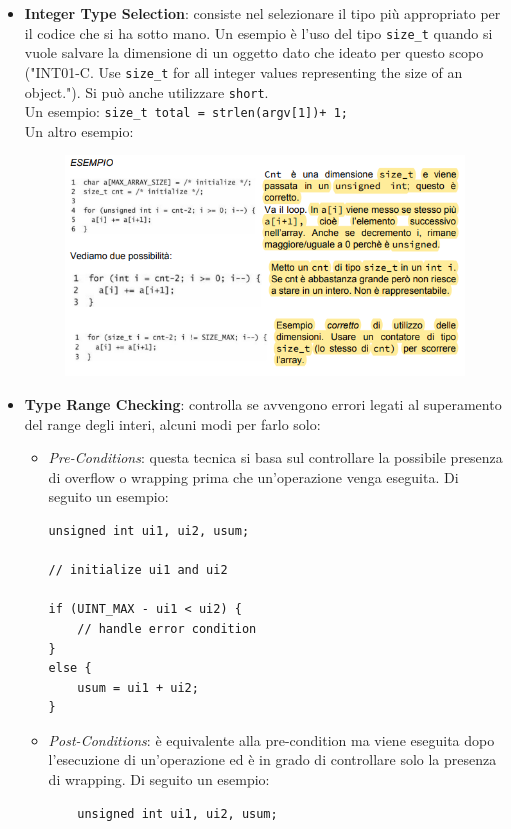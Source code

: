 \begin{itemize}
    \item \textbf{Integer Type Selection}:
          consiste nel selezionare il tipo più
          appropriato per il codice che si ha sotto mano.
          Un esempio è l'uso del tipo \verb|size_t| quando si vuole salvare la dimensione di un oggetto dato che ideato per questo scopo
          ("INT01-C. Use \verb|size_t| for all integer values representing the size of
          an object.").
          Si può anche utilizzare \verb|short|.\\
          Un esempio: \verb|size_t total = strlen(argv[1])+ 1;|\\
          Un altro esempio:
          \begin{figure}[H]
              \centering
              \includegraphics[width=12cm, keepaspectratio]{capitoli/secure_coding/img/cap_2/esempio_sizet.png}
          \end{figure}

    \item \textbf{Type Range Checking}:
          controlla se avvengono errori legati al superamento del range degli interi,
          alcuni modi per farlo solo: \begin{itemize}
              \item \textit{Pre-Conditions}:
                    questa tecnica si basa sul controllare la possibile presenza di
                    overflow o wrapping prima che un'operazione venga eseguita.
                    Di seguito un esempio:
                    \begin{lstlisting}
unsigned int ui1, ui2, usum;

// initialize ui1 and ui2

if (UINT_MAX - ui1 < ui2) {
    // handle error condition
}
else {
    usum = ui1 + ui2;
}
                    \end{lstlisting}
              \item \textit{Post-Conditions}:
                    è equivalente alla pre-condition ma viene eseguita dopo
                    l'esecuzione di un'operazione ed è in grado di controllare solo la
                    presenza di wrapping. Di seguito un esempio:
                    \begin{lstlisting}
    unsigned int ui1, ui2, usum;


\end{lstlisting}
\end{itemize}
\end{itemize}
